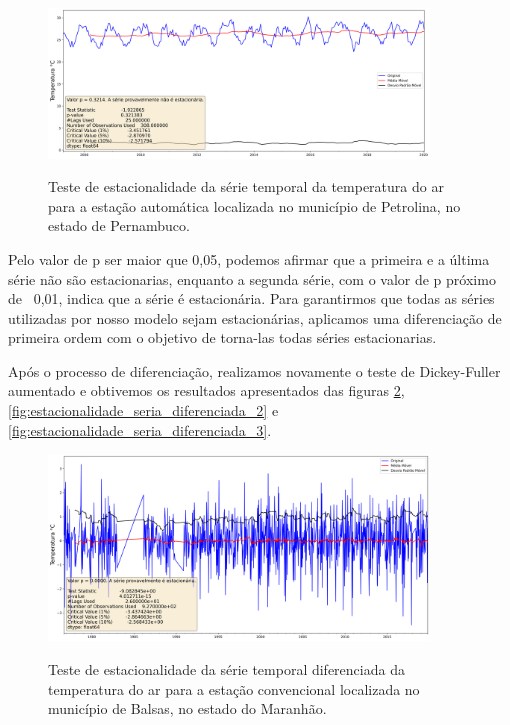 \begin{figure}[H]
    \centering
    \caption{Teste de estacionalidade da série temporal da temperatura do ar para a estação automática localizada no município de Petrolina, no estado de Pernambuco.}
    \includegraphics[width=0.9\textwidth]{figuras/dickey_fuller_raw_712f3e11658051636f09732a60fb3c1b.png}
    \label{fig:estacionalidade_seria_original_3}
\end{figure}

Pelo valor de p ser maior que 0,05, podemos afirmar que a primeira e a última série não são estacionarias, enquanto a segunda série, com o valor de p próximo de ~0,01, indica que a série é estacionária. Para garantirmos que todas as séries utilizadas por nosso modelo sejam estacionárias, aplicamos uma diferenciação de primeira ordem com o objetivo de torna-las todas séries estacionarias. 

Após o processo de diferenciação, realizamos novamente o teste de Dickey-Fuller aumentado e obtivemos os resultados apresentados das figuras \ref{fig:estacionalidade_seria_diferenciada_1}, \ref{fig:estacionalidade_seria_diferenciada_2} e \ref{fig:estacionalidade_seria_diferenciada_3}.  

\begin{figure}[H]
    \centering
    \caption{Teste de estacionalidade da série temporal diferenciada da temperatura do ar para a estação convencional localizada no município de Balsas, no estado do Maranhão.}
    \includegraphics[width=0.9\textwidth]{figuras/dickey_fuller_diff_82768.png}
    \label{fig:estacionalidade_seria_diferenciada_1}
\end{figure}

